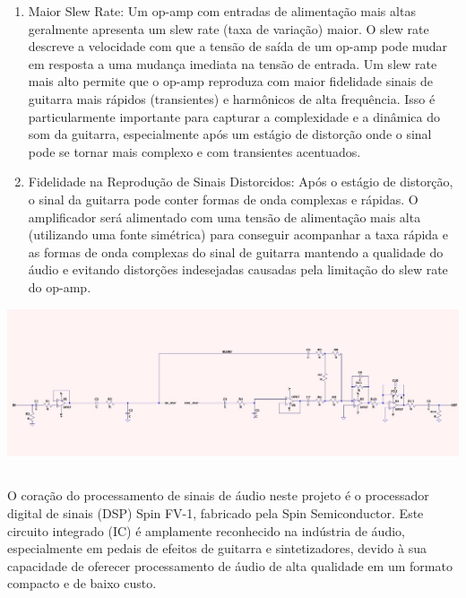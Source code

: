 \begin{enumerate}
  \item Maior Slew Rate: Um op-amp com entradas de alimentação mais altas geralmente apresenta um slew rate (taxa de variação) maior. O slew rate descreve a velocidade com que a tensão de saída de um op-amp pode mudar em resposta a uma mudança imediata na tensão de entrada. Um slew rate mais alto permite que o op-amp reproduza com maior fidelidade sinais de guitarra mais rápidos (transientes) e harmônicos de alta frequência. Isso é particularmente importante para capturar a complexidade e a dinâmica do som da guitarra, especialmente após um estágio de distorção onde o sinal pode se tornar mais complexo e com transientes acentuados.

  \item Fidelidade na Reprodução de Sinais Distorcidos: Após o estágio de distorção, o sinal da guitarra pode conter formas de onda complexas e rápidas. O amplificador será alimentado com uma tensão de alimentação mais alta (utilizando uma fonte simétrica) para 
conseguir acompanhar a taxa rápida e as formas de onda complexas do sinal de guitarra mantendo a qualidade do áudio e evitando distorções indesejadas causadas pela limitação do slew rate do op-amp. 
\end{enumerate}
\begin{center}
  \includegraphics[width=16cm]{Diagrams/circ.png}
\end{center}

\subsection{}

\subsubsection{}

O coração do processamento de sinais de áudio neste projeto é o processador digital de sinais (DSP) Spin FV-1, fabricado pela Spin Semiconductor. Este circuito integrado (IC) é amplamente reconhecido na indústria de áudio, especialmente em pedais de efeitos de guitarra e sintetizadores, devido à sua capacidade de oferecer processamento de áudio de alta qualidade em um formato compacto e de baixo custo.

